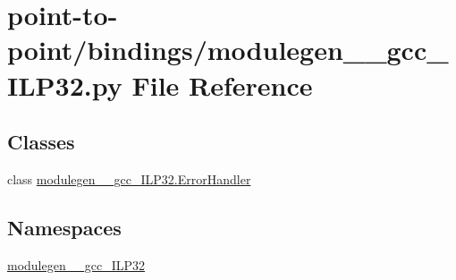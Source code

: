 \hypertarget{point-to-point_2bindings_2modulegen____gcc__ILP32_8py}{}\section{point-\/to-\/point/bindings/modulegen\+\_\+\+\_\+gcc\+\_\+\+I\+L\+P32.py File Reference}
\label{point-to-point_2bindings_2modulegen____gcc__ILP32_8py}
\subsection*{Classes}
\begin{DoxyCompactItemize}
\item 
class \hyperlink{classmodulegen____gcc__ILP32_1_1ErrorHandler}{modulegen\+\_\+\+\_\+gcc\+\_\+\+I\+L\+P32.\+Error\+Handler}
\end{DoxyCompactItemize}
\subsection*{Namespaces}
\begin{DoxyCompactItemize}
\item 
 \hyperlink{namespacemodulegen____gcc__ILP32}{modulegen\+\_\+\+\_\+gcc\+\_\+\+I\+L\+P32}
\end{DoxyCompactItemize}
